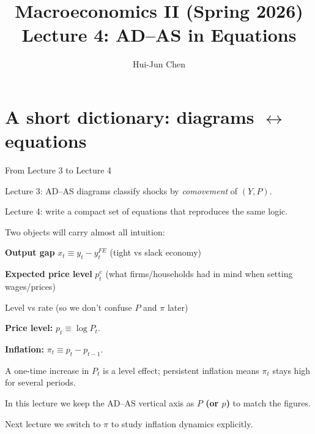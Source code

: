 \documentclass[aspectratio=169,xcolor=dvipsnames]{beamer}
\title[AD--AS (Math)]{Macroeconomics II (Spring 2026)\\\vspace{4pt}Lecture 4: AD--AS in Equations}
\author[Hui-Jun Chen]{Hui-Jun Chen}
\institute[]{National Tsing Hua University}
\date{}
\let\tempone\itemize
\let\temptwo\enditemize
\renewenvironment{itemize}{\tempone\addtolength{\itemsep}{\fill}}{\temptwo}
\begin{document}
\begin{frame}
    \titlepage
\end{frame}

\section[Dictionary]{A short dictionary: diagrams $\leftrightarrow$ equations}

\begin{frame}{From Lecture 3 to Lecture 4}
\begin{itemize}
\item Lecture 3: AD--AS diagrams classify shocks by \emph{comovement} of $(Y,P)$.
\item Lecture 4: write a compact set of equations that reproduces the same logic.
\item Two objects will carry almost all intuition:
\begin{itemize}
\item \textbf{Output gap} $x_t \equiv y_t - y_t^{FE}$ (tight vs slack economy)
\item \textbf{Expected price level} $p_t^e$ (what firms/households had in mind when setting wages/prices)
\end{itemize}
\end{itemize}
\end{frame}

\begin{frame}{Level vs rate (so we don't confuse $P$ and $\pi$ later)}
\begin{itemize}
\item \textbf{Price level:} $p_t \equiv \log P_t$.
\item \textbf{Inflation:} $\pi_t \equiv p_t - p_{t-1}$.
\item A one-time increase in $P_t$ is a level effect; persistent inflation means $\pi_t$ stays high for several periods.
\end{itemize}

\vspace{0.2em}
\begin{itemize}
\item In this lecture we keep the AD--AS vertical axis as \textbf{$P$ (or $p$)} to match the figures.
\item Next lecture we switch to \textbf{$\pi$} to study inflation dynamics explicitly.
\end{itemize}
\end{frame}
\end{document}
